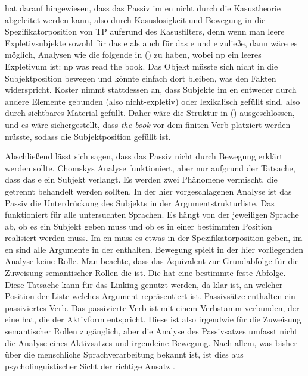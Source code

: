\citet[]{Koster86a} hat darauf hingewiesen, dass das Passiv im en nicht durch die Kasustheorie
abgeleitet werden kann, also durch Kasuslosigkeit und Bewegung in die Spezifikatorposition von TP aufgrund des Kasusfilters, denn wenn man leere Expletivsubjekte sowohl für das e als auch für das e und e zuließe, dann wäre es möglich,
Analysen wie die folgende in () zu haben, wobei np ein leeres Expletivum ist:
\ea
np was read the book.
\z
Das Objekt müsste sich nicht in die Subjektposition bewegen und könnte einfach dort bleiben, was den Fakten widerspricht.
Koster nimmt stattdessen an, dass Subjekte im en entweder durch andere Elemente gebunden (also nicht-expletiv) oder lexikalisch gefüllt sind, also
durch sichtbares Material gefüllt.
Daher wäre die Struktur in () ausgeschlossen, und es wäre sichergestellt, dass \emph{the book} vor dem
finiten Verb platziert werden müsste, sodass die Subjektposition gefüllt ist.

Abschließend lässt sich sagen, dass das Passiv nicht durch Bewegung erklärt werden sollte. Chomskys Analyse funktioniert,
aber nur aufgrund der Tatsache, dass das e ein Subjekt verlangt. Es werden zwei Phänomene vermischt, die
getrennt behandelt werden sollten. In der hier vorgeschlagenen Analyse ist das Passiv die Unterdrückung des
Subjekts in der Argumentstrukturliste. Das funktioniert für alle untersuchten Sprachen. Es hängt von der
jeweiligen Sprache ab, ob es ein Subjekt geben muss und ob es in
einer bestimmten Position realisiert werden muss. Im en muss es etwas in der Spezifikatorposition geben, im en sind alle
Argumente in der \compsl enthalten. Bewegung spielt in der hier vorliegenden Analyse keine Rolle. Man beachte, dass das Äquivalent zur
Grundabfolge für die Zuweisung semantischer Rollen die \argstl ist. Die \argstl hat eine bestimmte feste Abfolge. Diese Tatsache
kann für das Linking genutzt werden, da klar ist, an welcher Position der Liste welches Argument
repräsentiert ist. Passivsätze enthalten ein passiviertes Verb. Das passivierte Verb ist mit einem Verbstamm
verbunden, der eine \argstl hat, die der Aktivform entspricht. Diese \argstl ist also irgendwie für die
Zuweisung semantischer Rollen zugänglich, aber die Analyse des Passivsatzes umfasst nicht die Analyse eines
Aktivsatzes und irgendeine Bewegung. Nach allem, was bisher über die menschliche Sprachverarbeitung bekannt ist, ist dies
aus psycholinguistischer Sicht der richtige Ansatz \citep[Abschnitt~3.2]{Wasow2024a}. 

